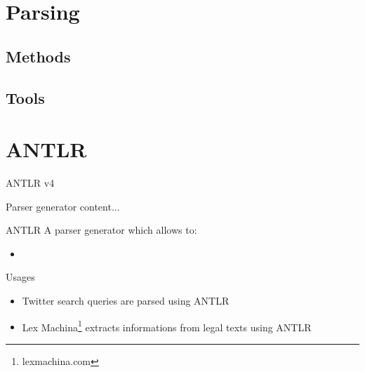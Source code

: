 \documentclass{beamer}
\begin{document}

\section{Parsing}

\subsection{Methods}

\subsection{Tools}

\section{ANTLR}

\begin{frame}{ANTLR v4}
	
\begin{block}{Parser generator}
	content...
\end{block}	
	
\begin{block}{ANTLR}
A parser generator which allows to:
\begin{itemize}
	\item 
\end{itemize}
\end{block}

\begin{exampleblock}{Usages}
	\begin{itemize}
		\item Twitter search queries are parsed using ANTLR
		\item Lex Machina\footnote{lexmachina.com} extracts informations from legal texts using ANTLR
	\end{itemize}
\end{exampleblock}
	
\end{frame}
\end{document}
